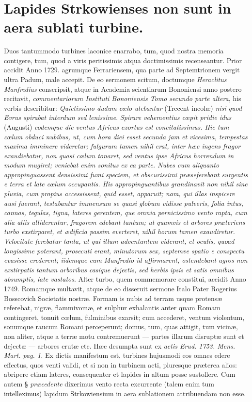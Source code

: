 \documentclass[a4paper, 11pt, oneside, polutonikogreek, latin]{article}
\begin{document}
\section{Lapides Strkowienses non sunt in aera sublati turbine.}
\paragraph{}
Duos tantummodo turbines laconice enarrabo, tum, quod nostra memoria contigere, tum, quod a viris peritissimis atqua doctimissimis recenseantur. Prior accidit Anno 1729. agrumque Ferrariensem, qua parte ad Septemtrionem vergit ultra Padum, male accepit. De eo sermonem scitum, doctumque \emph{Heraclitus Manfredius} conscripsit, atque in Academia scientiarum Bononiensi anno postero recitavit, \emph{commentariorum Instituti Bononiensis Tomo secundo parte altera}, his verbis describitur: \emph{Quietissimo dudum cœlo utebantur} (Trecent incolæ) \emph{nisi quod Evrus spirabat interdum sed lenissime}. \emph{Spirare vehementius cœpit pridie idus} (Augusti) \emph{codemque die ventus Africus exortus est concitatissimus. Hic tum cœlum obduci nubibus, ut, cum hora diei esset secunda jam et vicesima, tempestas maxima imminere videretur; fulgurum tamen nihil erat, inter hæc ingens fragor exaudiebatur, non quasi cœlum tonaret, sed ventus ipse Africus horrendum in modum mugiret; veniebat enim sonitus ex ea parte. Nubes cum aliquanto appropinguassent densissimi fumi speciem, et obscurissimi præseferebant surgentis e terra et late cœlum occupantis. His appropinguantibus grandinavit non nihil sine pluvia, cum propius accessissent, quid esset, apparuit; nam, qui illas inspicere ausi fuerant, testabantur immensum se quasi globum vidisse pulveris, folia intus, cannas, tegulas, tigna, lateres gerentem, que omnia pernicissimo vento rapta, cum alia aliis alliderentur, fragorem edebant tantum; ut quamvis et arbores præteriens turbo exstirparet, et ædificia passim everteret, nihil horum tamen exaudiretur. Velocitate ferebatur tanta, ut qui illum adventantem viderant, et oculis, quoad longissime poterant, prosecuti erant, minutorum sex, septemve spatio e conspectu evasisse crederent; iidemque cum Manfredio id affirmarent, ostendebant agros non exstirpatis tantum arboribus casique dejectis, sed herbis ipsis et satis omnibus absumptis, late vastatos}. Alter turbo, quem commemorare constitui, accidit Anno 1749. Romamque multavit, atque de eo disseruit sermone Italo Pater Rogerius Bosscovich Societatis nostræ. Formam is nubis ad terram usque protensæ referebat, nigræ, flammivomæ, et sulphur exhalantis anter quam Romam contingeret, tonuit cœlum, fulminibus exarsit; cum accederet, ventum violentum, sonumque raucum Romani perceperunt; domus, tum, quas attigit, tum vicinæ, non aliter, atque a terræ motu contremuerunt --- partes illarum disruptæ sunt et dejectæ --- arbores erutæ etc. Hæc desumpta sunt ex \emph{actis Erud. 1753. Mens. Mart. pag. 1.} Ex dictis manifestum est, turbines hujusmodi eos omnes edere effectus, quos venti validi, et si non in turbinem acti, pluresque præterea alios: abripere etiam lateres, consequenter et lapides in altum posse sustollere. Cum autem § \emph{præcedente} dixerimus vento recta excurrente (talem enim tum intelleximus) lapidum Strkowiensium in aera sublationem attribuendam non esse.
\end{document}
